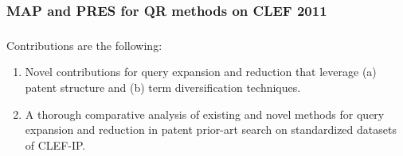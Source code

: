 \documentclass[xcolor=x11names,compress]{beamer}
\renewcommand{\(}{\begin{columns}}
\renewcommand{\)}{\end{columns}}
\newcommand{\<}[1]{\begin{column}{#1}}
\renewcommand{\>}{\end{column}}
\begin{document}
\begin{frame}
\frametitle{MAP and PRES for QR methods on CLEF 2011}






\end{frame}


\begin{frame}
\frametitle{}

Contributions are the following: 
\begin{enumerate}
\item Novel contributions for query expansion and reduction that leverage
(a) patent structure and (b) term diversification techniques. 
\item A thorough comparative analysis of existing and novel methods for
query expansion and reduction in patent prior-art search on standardized
datasets of CLEF-IP. 
\end{enumerate}
\end{frame}


\begin{frame}
\frametitle{}
\end{frame}

%
% 
\end{document}
